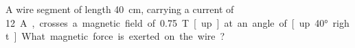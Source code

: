 %
%
%
%




\begin{example}
  A wire segment of length \SI{40}{\centi\metre}, carrying a current of
  \SI{12}\ampere, crosses a magnetic field of \SI{.75}{\tesla} [up] at an
  angle of [up \ang{40} right].  What magnetic force is exerted on the wire?
\end{example}


